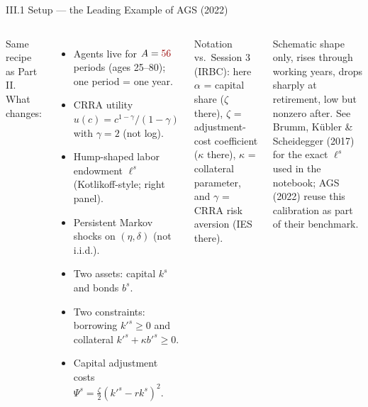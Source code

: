 \documentclass[aspectratio=169,11pt]{beamer}
\newcommand{\emphc}[1]{\textcolor{harvardcrimson}{#1}}
\begin{document}
\begin{frame}[shrink=6]{III.1 Setup --- the Leading Example of AGS (2022)}
\small
\begin{columns}[T]
\emphc{Same recipe as Part II.  What changes:}
\begin{itemize}\itemsep1pt
    \item Agents live for $A = \emphc{56}$ periods (ages 25--80); one period = one year.
    \item CRRA utility $u(c) = c^{1-\gamma}/(1-\gamma)$ with $\gamma = 2$ (\emphc{not} log).
    \item \emphc{Hump-shaped labor endowment} $\ell^s$ (Kotlikoff-style; right panel).
    \item \emphc{Persistent} Markov shocks on $(\eta,\delta)$ (not i.i.d.).
    \item \emphc{Two assets}: capital $k^s$ and bonds $b^s$.
    \item \emphc{Two constraints}: borrowing $k'^s \ge 0$ and collateral $k'^s + \kappa b'^s \ge 0$.
    \item Capital adjustment costs $\Psi^s = \tfrac{\zeta}{2}(k'^s - r k^s)^2$.
\end{itemize}

\vspace{0.2em}
{\scriptsize \emphc{Notation vs.\ Session 3 (IRBC):} here $\alpha$ = capital share ($\zeta$ there), $\zeta$ = adjustment-cost coefficient ($\kappa$ there), $\kappa$ = collateral parameter, and $\gamma$ = CRRA risk aversion (IES there).}

\centering
{}

{\scriptsize \emphc{Schematic shape only}, rises through working years, drops sharply at retirement, low but nonzero after.  See \emphc{Brumm, K\"ubler \& Scheidegger (2017)} for the exact $\ell^s$ used in the notebook; AGS (2022) reuse this calibration as part of their benchmark.}
\end{columns}
\end{frame}
\end{document}
